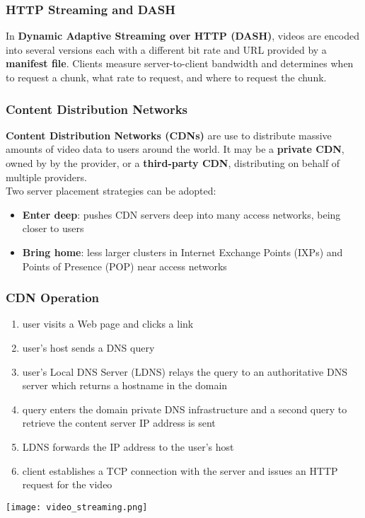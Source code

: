 \documentclass{article}
\begin{document}
\subsubsection{HTTP Streaming and DASH}
In \textbf{Dynamic Adaptive Streaming over HTTP (DASH)}, videos are encoded into several versions each with a different bit rate and URL provided by a \textbf{manifest file}. Clients measure server-to-client bandwidth and determines when to request a chunk, what rate to request, and where to request the chunk.
\subsubsection{Content Distribution Networks}
\textbf{Content Distribution Networks (CDNs)} are use to distribute massive amounts of video data to users around the world. It may be a \textbf{private CDN}, owned by by the provider, or a \textbf{third-party CDN}, distributing on behalf of multiple providers. \\
Two server placement strategies can be adopted:
\begin{itemize}
    \item \textbf{Enter deep}: pushes CDN servers deep into many access networks, being closer to users
    \item \textbf{Bring home}: less larger clusters in Internet Exchange Points (IXPs) and Points of Presence (POP) near access networks
\end{itemize}
\subsubsection*{CDN Operation}
\begin{enumerate}
    \item user visits a Web page and clicks a link
    \item user's host sends a DNS query
    \item user's Local DNS Server (LDNS) relays the query to an authoritative DNS server which returns a hostname in the domain
    \item query enters the domain private DNS infrastructure and a second query to retrieve the content server IP address is sent
    \item LDNS forwards the IP address to the user's host
    \item client establishes a TCP connection with the server and issues an HTTP request for the video
\end{enumerate}
\begin{center}
    \texttt{[image: video\_streaming.png]}
\end{center}
\end{document}
